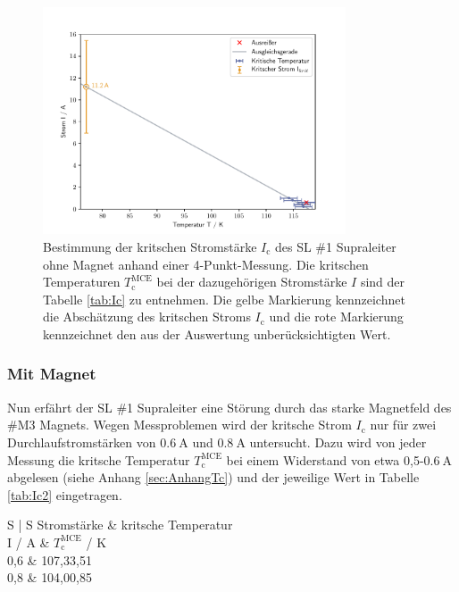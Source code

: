 \begin{figure}[H]
    \centering
    \includegraphics[width=0.8\textwidth]{Auswertung/I_krit_Pt/I_krit.pdf}
    \caption{Bestimmung der kritschen Stromstärke $I_{\text{c}}$ des SL \#1 Supraleiter ohne
		Magnet anhand einer 4-Punkt-Messung. Die kritschen Temperaturen $T^{\text{MCE}}_{\text{c}}$
		bei der dazugehörigen Stromstärke $I$ sind der Tabelle \ref{tab:Ic} zu entnehmen.
		Die gelbe Markierung kennzeichnet die Abschätzung des kritschen Stroms $I_{\text{c}}$
		und die rote Markierung kennzeichnet den aus der Auswertung unberücksichtigten Wert.}
\label{fig:Ic}
\end{figure}

\subsubsection{Mit Magnet}
\label{sec:mitB1}
Nun erfährt der SL \#1 Supraleiter eine Störung durch das starke Magnetfeld des
\#M3 Magnets. Wegen Messproblemen wird der kritsche Strom $I_{\text{c}}$ nur für zwei
Durchlaufstromstärken von $\SI{0,6}{\ampere}$ und $\SI{0,8}{\ampere}$ untersucht.
Dazu wird von jeder Messung
die kritsche Temperatur $T^{\text{MCE}}_{\text{c}}$ bei einem Widerstand von etwa
0,5-$\SI{0,6}{\ampere}$ abgelesen (siehe Anhang \ref{sec:AnhangTc}) und der
jeweilige Wert in Tabelle \ref{tab:Ic2} eingetragen.

\begin{table}
  \centering
  \caption{Kritsche Temperatur $T^{\text{MCE}}_{\text{c}}$ für fünf unterschiedliche
	Durchlaufstromstärken mit Magnetfeld des \#M3 Magnets.}
  \label{tab:Ic2}
  \begin{tabular}{S | S}
    \toprule
    {Stromstärke} & {kritsche Temperatur} \\
    {I / A} & {$T^{\text{MCE}}_{\text{c}}$ / K }  \\
    \midrule
		{0,6} & {107,33,51}	\\
		{0,8} & {104,00,85}	\\
    \bottomrule
  \end{tabular}
\end{table}

